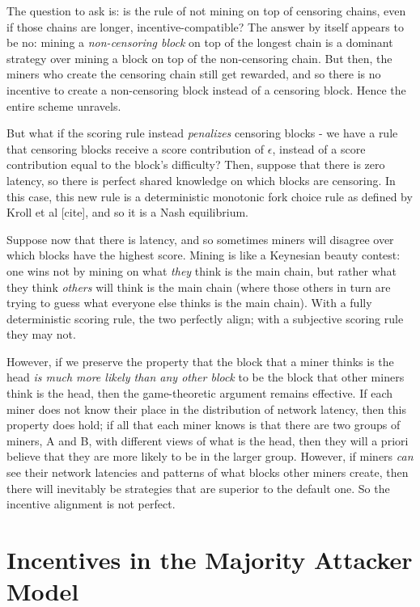 \documentclass[12pt]{article}
\begin{document}
The question to ask is: is the rule of not mining on top of censoring chains, even if those chains are longer, incentive-compatible? The answer by itself appears to be no: mining a \textit{non-censoring block} on top of the longest chain is a dominant strategy over mining a block on top of the non-censoring chain. But then, the miners who create the censoring chain still get rewarded, and so there is no incentive to create a non-censoring block instead of a censoring block. Hence the entire scheme unravels.

But what if the scoring rule instead \textit{penalizes} censoring blocks - we have a rule that censoring blocks receive a score contribution of $\epsilon$, instead of a score contribution equal to the block's difficulty? Then, suppose that there is zero latency, so there is perfect shared knowledge on which blocks are censoring. In this case, this new rule is a deterministic monotonic fork choice rule as defined by Kroll et al [cite], and so it is a Nash equilibrium.

Suppose now that there is latency, and so sometimes miners will disagree over which blocks have the highest score. Mining is like a Keynesian beauty contest: one wins not by mining on what \textit{they} think is the main chain, but rather what they think \textit{others} will think is the main chain (where those others in turn are trying to guess what everyone else thinks is the main chain). With a fully deterministic scoring rule, the two perfectly align; with a subjective scoring rule they may not.

However, if we preserve the property that the block that a miner thinks is the head \textit{is much more likely than any other block} to be the block that other miners think is the head, then the game-theoretic argument remains effective. If each miner does not know their place in the distribution of network latency, then this property does hold; if all that each miner knows is that there are two groups of miners, A and B, with different views of what is the head, then they will a priori believe that they are more likely to be in the larger group. However, if miners \textit{can} see their network latencies and patterns of what blocks other miners create, then there will inevitably be strategies that are superior to the default one. So the incentive alignment is not perfect.

\section{Incentives in the Majority Attacker Model}
\end{document}

